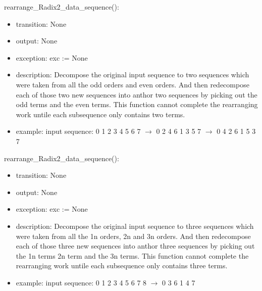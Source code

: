 \documentclass[12pt, titlepage]{article}
\begin{document}
rearrange\_Radix2\_data\_sequence():
\begin{itemize}
\item transition: None
\item output:  None
\item exception: exc := None
\item description: Decompose the original input sequence to two sequences which were taken from all the odd orders and even orders.
And then redecompose each of those two new sequences into anthor  two sequences by picking out the odd terms and the even terms.
This function cannot complete the rearranging work untile each subsequence only contains two terms.
\item example: input sequence: 0 1 2 3 4 5 6 7 $\rightarrow$ 0 2 4 6 1 3 5 7 $\rightarrow$ 0 4 2 6 1 5 3 7
\end{itemize}
rearrange\_Radix2\_data\_sequence():
\begin{itemize}
\item transition: None
\item output:  None
\item exception: exc := None
\item description: Decompose the original input sequence to three sequences which were taken from all the 1n orders, 2n and 3n orders.
And then redecompose each of those three new sequences into anthor three sequences by picking out the 1n terms 2n term and the 3n terms.
This function cannot complete the rearranging work untile each subsequence only contains three terms.
\item example: input sequence: 0 1 2 3 4 5 6 7 8 $\rightarrow$ 0 3 6 1 4 7 
\end{itemize}
\end{document}

